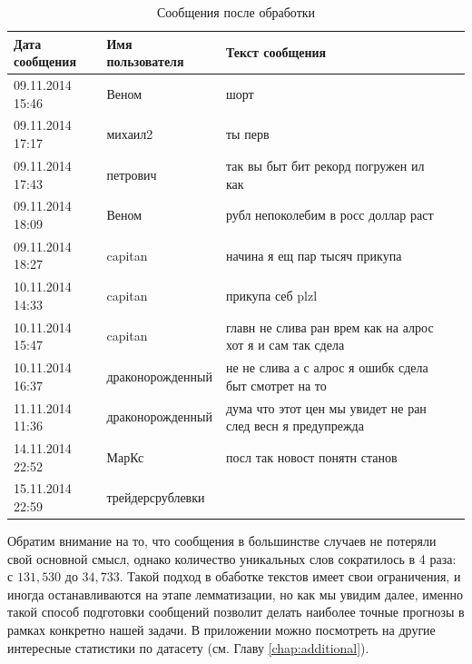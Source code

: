 \documentclass{article}
\begin{document}
\begin{table}[h]
	\caption{Сообщения после обработки}
	\centering
	\begin{tabular}{llp{9.45cm}l}
		\toprule
		Дата сообщения     &  Имя пользователя    & Текст сообщения  \\
		\midrule
		09.11.2014 15:46     & Веном  & шорт		\\
		09.11.2014 17:17     & михаил2 & ты	перв    \\
		09.11.2014 17:43     & петрович       &  так вы быт бит рекорд погружен ил как   \\
		09.11.2014 18:09     & Веном  & рубл непоколебим в росс доллар раст	\\
		09.11.2014 18:27     & capitan & начина я ещ пар тысяч прикупа	      \\
		10.11.2014 14:33     & capitan       & прикупа себ plzl  \\
		10.11.2014 15:47     & capitan       & главн не слива ран врем как на алрос хот я и сам так сдела  \\
		10.11.2014 16:37   & драконорожденный       & не не слива а с алрос я ошибк сдела быт смотрет на то \\    
		11.11.2014 11:36     & драконорожденный       & дума что этот цен мы увидет не ран след весн я предупрежда \\    
		
		14.11.2014 22:52   & МарКс       &  посл так новост понятн станов \\    
		15.11.2014 22:59     & трейдерсрублевки       &  	 \\    
		\bottomrule
	\end{tabular}
	\label{tab:table2}
\end{table}

Обратим внимание на то, что сообщения в большинстве случаев не потеряли свой основной смысл, однако количество уникальных слов сократилось в 4 раза: с $131,530$ до $34,733$. Такой подход в обаботке текстов имеет свои ограничения, и иногда останавливаются на этапе лемматизации, но как мы увидим далее, именно такой способ подготовки сообщений позволит делать наиболее точные прогнозы в рамках конкретно нашей задачи. В приложении можно посмотреть на другие интересные статистики по датасету (см. Главу \ref{chap:additional}).
\end{document}
